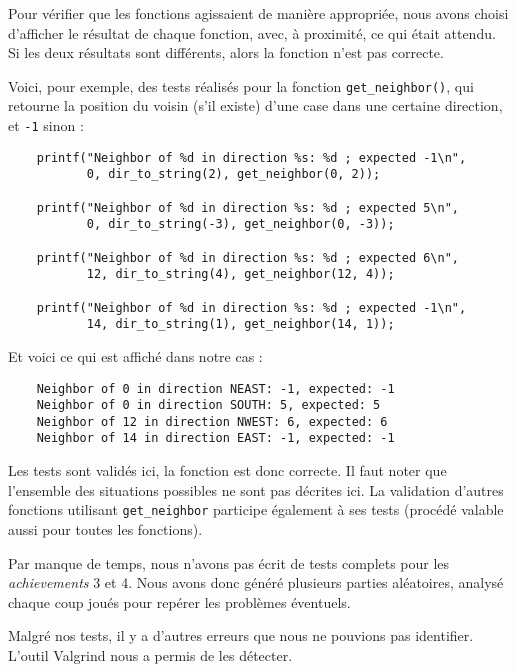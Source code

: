 \documentclass[a4paper]{article}
\begin{document}
Pour vérifier que les fonctions agissaient de manière appropriée, nous avons choisi d'afficher le résultat de chaque fonction, avec, à proximité, ce qui était attendu. Si les deux résultats sont différents, alors la fonction n'est pas correcte.

Voici, pour exemple, des tests réalisés pour la fonction \verb|get_neighbor()|, qui retourne la position du voisin (s'il existe) d'une case dans une certaine direction, et \verb|-1| sinon :

\begin{verbatim}
    printf("Neighbor of %d in direction %s: %d ; expected -1\n",
           0, dir_to_string(2), get_neighbor(0, 2));
           
    printf("Neighbor of %d in direction %s: %d ; expected 5\n",
           0, dir_to_string(-3), get_neighbor(0, -3));
           
    printf("Neighbor of %d in direction %s: %d ; expected 6\n",
           12, dir_to_string(4), get_neighbor(12, 4));
           
    printf("Neighbor of %d in direction %s: %d ; expected -1\n",
           14, dir_to_string(1), get_neighbor(14, 1));
\end{verbatim}

Et voici ce qui est affiché dans notre cas :

\begin{verbatim}
    Neighbor of 0 in direction NEAST: -1, expected: -1
    Neighbor of 0 in direction SOUTH: 5, expected: 5
    Neighbor of 12 in direction NWEST: 6, expected: 6
    Neighbor of 14 in direction EAST: -1, expected: -1
\end{verbatim}

Les tests sont validés ici, la fonction est donc correcte. Il faut noter que l'ensemble des situations possibles ne sont pas décrites ici. La validation d'autres fonctions utilisant \verb|get_neighbor| participe également à ses tests (procédé valable aussi pour toutes les fonctions).

Par manque de temps, nous n'avons pas écrit de tests complets pour les \emph{achievements} 3 et 4. Nous avons donc généré plusieurs parties aléatoires, analysé chaque coup joués pour repérer les problèmes éventuels.

\vspace{0.5cm}

Malgré nos tests, il y a d'autres erreurs que nous ne pouvions pas identifier. L'outil Valgrind nous a permis de les détecter.
\end{document}
